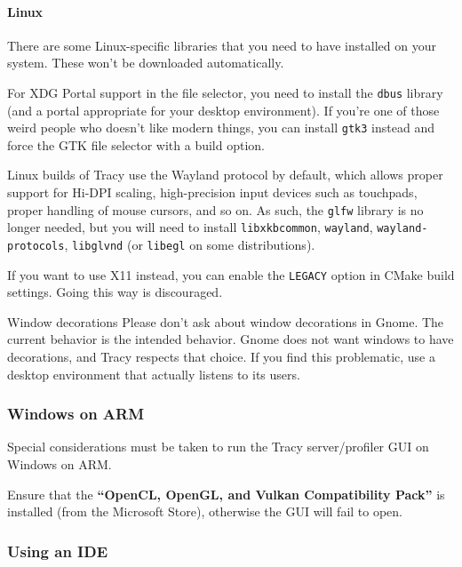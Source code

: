 \documentclass[hidelinks,titlepage,a4paper,twoside]{article}
\begin{document}
\paragraph{Linux}

There are some Linux-specific libraries that you need to have installed on your system. These won't be downloaded automatically.

For XDG Portal support in the file selector, you need to install the \texttt{dbus} library (and a portal appropriate for your desktop environment). If you're one of those weird people who doesn't like modern things, you can install \texttt{gtk3} instead and force the GTK file selector with a build option.

Linux builds of Tracy use the Wayland protocol by default, which allows proper support for Hi-DPI scaling, high-precision input devices such as touchpads, proper handling of mouse cursors, and so on. As such, the \texttt{glfw} library is no longer needed, but you will need to install \texttt{libxkbcommon}, \texttt{wayland}, \texttt{wayland-protocols}, \texttt{libglvnd} (or \texttt{libegl} on some distributions).

If you want to use X11 instead, you can enable the \texttt{LEGACY} option in CMake build settings. Going this way is discouraged.

\begin{bclogo}[
noborder=true,
couleur=black!5,
logo=\bcbombe
]{Window decorations}
Please don't ask about window decorations in Gnome. The current behavior is the intended behavior. Gnome does not want windows to have decorations, and Tracy respects that choice. If you find this problematic, use a desktop environment that actually listens to its users.
\end{bclogo}

\subsubsection{Windows on ARM}

Special considerations must be taken to run the Tracy server/profiler GUI on Windows on ARM.

Ensure that the \textbf{\enquote{OpenCL, OpenGL, and Vulkan Compatibility Pack}} is installed (from the Microsoft Store), otherwise the GUI will fail to open.

\subsubsection{Using an IDE}
\end{document}
